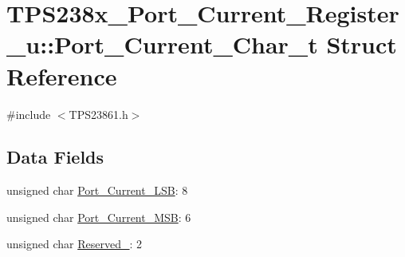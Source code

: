 \hypertarget{struct_t_p_s238x___port___current___register__u_1_1_port___current___char__t}{\section{T\-P\-S238x\-\_\-\-Port\-\_\-\-Current\-\_\-\-Register\-\_\-u\-:\-:Port\-\_\-\-Current\-\_\-\-Char\-\_\-t Struct Reference}
\label{struct_t_p_s238x___port___current___register__u_1_1_port___current___char__t}
}


{\ttfamily \#include $<$T\-P\-S23861.\-h$>$}

\subsection*{Data Fields}
\begin{DoxyCompactItemize}
\item 
unsigned char \hyperlink{struct_t_p_s238x___port___current___register__u_1_1_port___current___char__t_a04a6f439a25c2e74de3a13b7dfa27e49}{Port\-\_\-\-Current\-\_\-\-L\-S\-B}\-: 8
\item 
unsigned char \hyperlink{struct_t_p_s238x___port___current___register__u_1_1_port___current___char__t_a557f7cf4429cfcf3a8d17d4293340b08}{Port\-\_\-\-Current\-\_\-\-M\-S\-B}\-: 6
\item 
unsigned char \hyperlink{struct_t_p_s238x___port___current___register__u_1_1_port___current___char__t_a0b4640d32cb54bace424e7259670e8d5}{Reserved\-\_}\-: 2
\end{DoxyCompactItemize}


